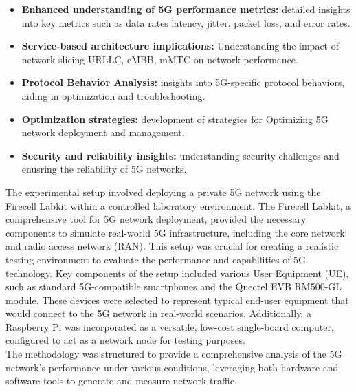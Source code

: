 \documentclass{report}
\begin{document}
\begin{itemize}
	\item \textbf{Enhanced understanding of 5G performance metrics:} detailed insights into key metrics such as data rates latency, jitter, packet loss, and error rates. 
	\item \textbf{Service-based architecture implications:} Understanding the impact of network slicing URLLC, eMBB, mMTC on network performance. 
	\item \textbf{Protocol Behavior Analysis:} insights into 5G-specific protocol behaviors, aiding in optimization and troubleshooting.
	\item \textbf{Optimization strategies:} development of strategies for Optimizing 5G network deployment and management.
	\item \textbf{Security and reliability insights:} understanding security challenges and enusring the reliability of 5G networks.
\end{itemize}
The experimental setup involved deploying a private 5G network using the Firecell Labkit within a controlled laboratory environment. The Firecell Labkit, a comprehensive tool for 5G network deployment, provided the necessary components to simulate real-world 5G infrastructure, including the core network and radio access network (RAN). This setup was crucial for creating a realistic testing environment to evaluate the performance and capabilities of 5G technology.
Key components of the setup included various User Equipment (UE), such as standard 5G-compatible smartphones and the Quectel EVB RM500-GL module. These devices were selected to represent typical end-user equipment that would connect to the 5G network in real-world scenarios. Additionally, a Raspberry Pi was incorporated as a versatile, low-cost single-board computer, configured to act as a network node for testing purposes.\\
The methodology was structured to provide a comprehensive analysis of the 5G network's performance under various conditions, leveraging both hardware and software tools to generate and measure network traffic.
\end{document}
